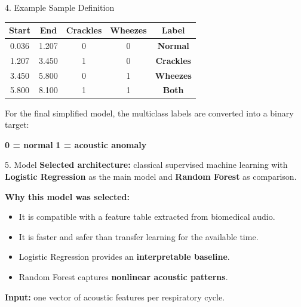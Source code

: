 \documentclass[aspectratio=169]{beamer}
\newcommand{\important}[1]{\textcolor{YachayBlue}{\textbf{#1}}}
\begin{document}
\begin{frame}{4. Example Sample Definition}
\small
\renewcommand{\arraystretch}{1.25}
\begin{tabular}{ccccc}
\toprule
\textbf{Start} & \textbf{End} & \textbf{Crackles} & \textbf{Wheezes} & \textbf{Label} \\
\midrule
0.036 & 1.207 & 0 & 0 & \important{Normal} \\
1.207 & 3.450 & 1 & 0 & \important{Crackles} \\
3.450 & 5.800 & 0 & 1 & \important{Wheezes} \\
5.800 & 8.100 & 1 & 1 & \important{Both} \\
\bottomrule
\end{tabular}

\vspace{0.45cm}
For the final simplified model, the multiclass labels are converted into a binary target:

\vspace{0.15cm}
\centering
\important{0 = normal} \hspace{0.8cm} \important{1 = acoustic anomaly}
\end{frame}

\begin{frame}{5. Model}
\small
\textbf{Selected architecture:} classical supervised machine learning with \important{Logistic Regression} as the main model and \important{Random Forest} as comparison.

\vspace{0.3cm}
\textbf{Why this model was selected:}
\begin{itemize}
    \item It is compatible with a feature table extracted from biomedical audio.
    \item It is faster and safer than transfer learning for the available time.
    \item Logistic Regression provides an \important{interpretable baseline}.
    \item Random Forest captures \important{nonlinear acoustic patterns}.
\end{itemize}

\vspace{0.15cm}
\textbf{Input:} one vector of acoustic features per respiratory cycle.
\end{frame}
\end{document}
